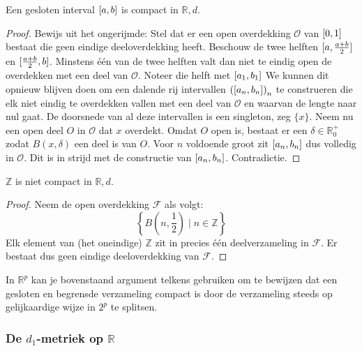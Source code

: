 \documentclass[main.tex]{subfiles}
\begin{document}
\begin{vb}
  Een gesloten interval $\interval{a}{b}$ is compact in $\mathbb{R},d$.

  \begin{proof}
    Bewijs uit het ongerijmde:
    Stel dat er een open overdekking $\mathcal{O}$ van $\interval{0}{1}$ bestaat die geen eindige deeloverdekking heeft.
    Beschouw de twee helften $\interval{a}{\frac{a+b}{2}}$ en $\interval{\frac{a+b}{2}}{b}$.
    Minstens \'e\'en van de twee helften valt dan niet te eindig open de overdekken met een deel van $\mathcal{O}$.\waarom
    Noteer die helft met $\interval{a_{1}}{b_{1}}$
    We kunnen dit opnieuw blijven doen om een dalende rij intervallen $\left(\interval{a_{n}}{b_{n}}\right)_{n}$ te construeren die elk niet eindig te overdekken vallen met een deel van $\mathcal{O}$ en waarvan de lengte naar nul gaat.
    De doorsnede van al deze intervallen is een singleton, zeg $\{x\}$.
    Neem nu een open deel $O$ in $\mathcal{O}$ dat $x$ overdekt.
    Omdat $O$ open is, bestaat er een $\delta \in \mathbb{R}_{0}^{+}$ zodat $B(x,\delta)$ een deel is van $O$.
    Voor $n$ voldoende groot  zit $\interval{a_{n}}{b_{n}}$ dus volledig in $\mathcal{O}$.
    Dit is in strijd met de constructie van $\interval{a_{n}}{b_{n}}$.
    Contradictie.
  \end{proof}
\end{vb}

\begin{vb}
  $\mathbb{Z}$ is niet compact in $\mathbb{R},d$.

  \begin{proof}
    Neem de open overdekking $\mathcal{F}$ als volgt:
    \[ \left\{ B\left(n,\frac{1}{2}\right) \mid n \in \mathbb{Z} \right\} \]
    Elk element van (het oneindige) $\mathbb{Z}$ zit in precies \'e\'en deelverzameling in $\mathcal{F}$.
    Er bestaat dus geen eindige deeloverdekking van $\mathcal{F}$.
  \end{proof}
\end{vb}

\begin{opm}
  In $\mathbb{R}^{p}$ kan je bovenstaand argument telkens gebruiken om te bewijzen dat een gesloten en begrensde verzameling compact is door de verzameling steeds op gelijkaardige wijze in $2^{p}$ te splitsen.
\end{opm}

\subsubsection{De $d_1$-metriek op $\mathbb{R}$}
\label{sec:d_1-metriek-op}
\end{document}
